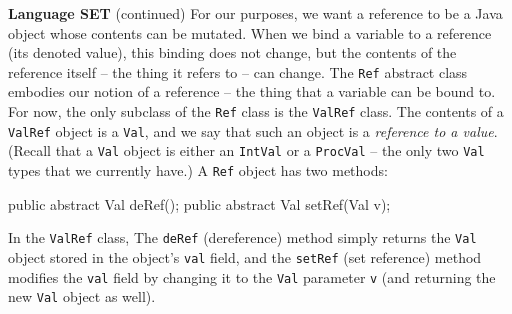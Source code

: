 \begin{minipage}[t]{\sw}
\slidenumber
\LARGE
{\bf Language SET} (continued)\exx
For our purposes, we want a reference to be
a Java object whose contents can be mutated.
When we bind a variable to a reference (its denoted value),
this binding does not change,
but the contents of the reference itself --
the thing it refers to -- can change.\exx
The \verb'Ref' abstract class embodies our notion of a reference --
the thing that a variable can be bound to.
For now, the only subclass of the \verb'Ref' class is
the \verb'ValRef' class.\exx
{\Large\emm{}}\exx
The contents of a \verb'ValRef' object
is a \verb'Val',
and we say that such an object is a {\em reference to a value}.
(Recall that a \verb'Val' object is either
an \verb'IntVal' or a \verb'ProcVal' --
the only two \verb'Val' types that we currently have.)\exx
A \verb'Ref' object has two methods:
{\Large
\begin{qv}
public abstract Val deRef();
public abstract Val setRef(Val v);
\end{qv}
}
In the \verb'ValRef' class,
The \verb'deRef' (dereference) method simply returns
the \verb'Val' object stored in the object's \verb'val' field,
and the \verb'setRef' (set reference) method
modifies the \verb'val' field
by changing it to the \verb'Val' parameter \verb'v'
(and returning the new \verb'Val' object as well).
\end{minipage}
\clearpage

